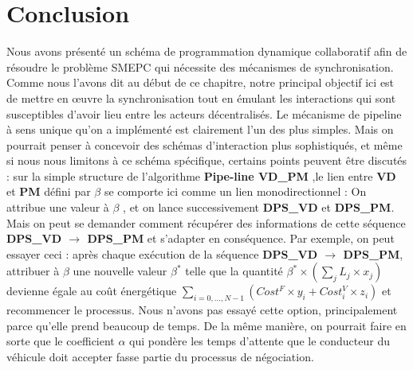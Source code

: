 \section{Conclusion}
Nous avons présenté un schéma de programmation dynamique collaboratif afin de résoudre le problème SMEPC qui nécessite des mécanismes de synchronisation.
Comme nous l'avons dit au début de ce chapitre, notre principal objectif ici est de mettre en œuvre la synchronisation tout en émulant les interactions qui sont susceptibles d'avoir lieu entre les acteurs décentralisés. Le mécanisme de pipeline à sens unique qu'on a implémenté est clairement l'un des plus simples. Mais on pourrait penser à concevoir des schémas d'interaction plus sophistiqués, et même si nous nous limitons à ce schéma spécifique, certains points peuvent être discutés :
	sur la simple structure de l'algorithme \textbf{Pipe-line VD\_PM}
	,le lien entre \textbf{VD} et \textbf{PM} défini par $\beta$ se comporte ici comme un lien monodirectionnel : On attribue une valeur à $\beta$ , et on lance successivement \textbf{DPS\_VD} et \textbf{DPS\_PM}. Mais on peut se demander comment récupérer des informations de cette séquence \textbf{DPS\_VD $\rightarrow$ DPS\_PM} et s'adapter en conséquence. Par exemple, on peut essayer ceci : après chaque exécution de la séquence \textbf{DPS\_VD $\rightarrow$ DPS\_PM}, attribuer à $\beta$ une nouvelle valeur $\beta^*$ telle que la quantité $\beta^* \times (\sum_j L_j \times x_j)$ devienne égale au coût énergétique $\sum_{i = 0, \dots, N -1} (Cost^F\times y_i + Cost^V_i\times z_i)$ et recommencer le processus. Nous n'avons pas essayé cette option, principalement parce qu'elle prend beaucoup de temps. De la même manière, on pourrait faire en sorte que le coefficient $\alpha$ qui pondère les temps d'attente que le conducteur du véhicule doit accepter fasse partie du processus de négociation.
	
		

